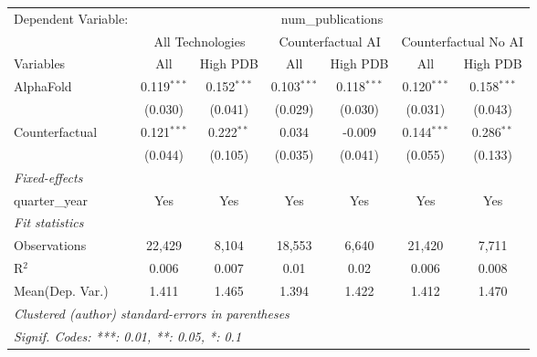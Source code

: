\begingroup
\centering
\begin{tabular}{lcccccc}
   \tabularnewline \midrule \midrule
   Dependent Variable: & \multicolumn{6}{c}{num\_publications}\\
 & \multicolumn{2}{c}{All Technologies} & \multicolumn{2}{c}{Counterfactual AI} & \multicolumn{2}{c}{Counterfactual No AI} \\
\cmidrule(lr){1-1}\cmidrule(lr){2-3} \cmidrule(lr){4-5} \cmidrule(lr){6-7}
Variables & \multicolumn{1}{c}{All} & \multicolumn{1}{c}{High PDB} & \multicolumn{1}{c}{All} & \multicolumn{1}{c}{High PDB} & \multicolumn{1}{c}{All} & \multicolumn{1}{c}{High PDB} \\
\cmidrule(lr){1-1}\cmidrule(lr){2-2} \cmidrule(lr){3-3} \cmidrule(lr){4-4} \cmidrule(lr){5-5} \cmidrule(lr){6-6} \cmidrule(lr){7-7}
   AlphaFold      & 0.119$^{***}$ & 0.152$^{***}$ & 0.103$^{***}$ & 0.118$^{***}$ & 0.120$^{***}$ & 0.158$^{***}$\\   
                  & (0.030)       & (0.041)       & (0.029)       & (0.030)       & (0.031)       & (0.043)\\   
   Counterfactual & 0.121$^{***}$ & 0.222$^{**}$  & 0.034         & -0.009        & 0.144$^{***}$ & 0.286$^{**}$\\   
                  & (0.044)       & (0.105)       & (0.035)       & (0.041)       & (0.055)       & (0.133)\\   
   \midrule
   \emph{Fixed-effects}\\
   quarter\_year  & Yes           & Yes           & Yes           & Yes           & Yes           & Yes\\  
   \midrule
   \emph{Fit statistics}\\
   Observations   & 22,429        & 8,104         & 18,553        & 6,640         & 21,420        & 7,711\\  
   R$^2$          & 0.006         & 0.007         & 0.01          & 0.02          & 0.006         & 0.008\\  
Mean(Dep. Var.) & 1.411 & 1.465 & 1.394 & 1.422 & 1.412 & 1.470 \\
   \midrule \midrule
   \multicolumn{7}{l}{\emph{Clustered (author) standard-errors in parentheses}}\\
   \multicolumn{7}{l}{\emph{Signif. Codes: ***: 0.01, **: 0.05, *: 0.1}}\\
\end{tabular}
\par\endgroup
